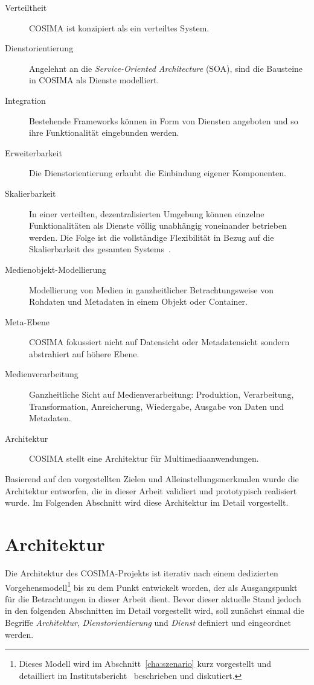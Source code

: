   \begin{description}
    \item[Verteiltheit] COSIMA ist konzipiert als ein verteiltes System.
    \item[Dienstorientierung] Angelehnt an die \emph{Service-Oriented Architecture} (SOA), sind die Bausteine in COSIMA als Dienste modelliert.
    \item[Integration] Bestehende Frameworks können in Form von Diensten angeboten und so ihre Funktionalität eingebunden werden.
    \item[Erweiterbarkeit] Die Dienstorientierung erlaubt die Einbindung eigener Komponenten.
    \item[Skalierbarkeit] In einer verteilten, dezentralisierten Umgebung können einzelne Funktionalitäten als Dienste völlig unabhängig voneinander betrieben werden. Die Folge ist die vollständige Flexibilität in Bezug auf die Skalierbarkeit des gesamten Systems~\citep[S. 294]{web_services_principles_and_technology}.
    \item[Medienobjekt-Modellierung] Modellierung von Medien in ganzheitlicher Betrachtungsweise von Rohdaten und Metadaten in einem Objekt oder Container.
    \item[Meta-Ebene] COSIMA fokussiert nicht auf Datensicht oder Metadatensicht sondern abstrahiert auf höhere Ebene.
    \item[Medienverarbeitung] Ganzheitliche Sicht auf Medienverarbeitung: Produktion, Verarbeitung, Transformation, Anreicherung, Wiedergabe, Ausgabe von Daten und Metadaten.
    \item[Architektur] COSIMA stellt eine Architektur für Multimediaanwendungen.
  \end{description}
  
  Basierend auf den vorgestellten Zielen und Alleinstellungsmerkmalen wurde die Architektur entworfen, die in dieser Arbeit validiert und prototypisch realisiert wurde. Im Folgenden Abschnitt wird diese Architektur im Detail vorgestellt.


\section{Architektur} %
\label{sec:architektur}

  Die Architektur des COSIMA-Projekts ist iterativ nach einem dedizierten Vorgehensmodell\footnote{Dieses Modell wird im Abschnitt~\ref{cha:szenario} kurz vorgestellt und detailliert im Institutsbericht~\citep[S. 7ff]{bericht} beschrieben und diskutiert.} bis zu dem Punkt entwickelt worden, der als Ausgangspunkt für die Betrachtungen in dieser Arbeit dient. Bevor dieser aktuelle Stand jedoch in den folgenden Abschnitten im Detail vorgestellt wird, soll zunächst einmal die Begriffe \emph{Architektur}, \emph{Dienstorientierung} und \emph{Dienst} definiert und eingeordnet werden.
  
